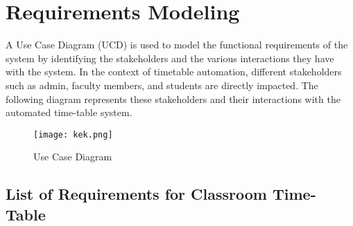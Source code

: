 \documentclass[12pt]{article}
\begin{document}
\newpage

\section{Requirements Modeling}
A Use Case Diagram (UCD) is used to model the functional requirements of the system by identifying the stakeholders and the various interactions they have with the system. In the context of timetable automation, different stakeholders such as admin, faculty members, and students are directly impacted. The following diagram represents these stakeholders and their interactions with the automated time-table system.
\begin{figure}[H]
    \centering
    \texttt{[image: kek.png]}
    \caption{Use Case Diagram}
    \label{fig:placeholder}
\end{figure}
\subsection{List of Requirements for Classroom Time-Table}  
\end{document}
